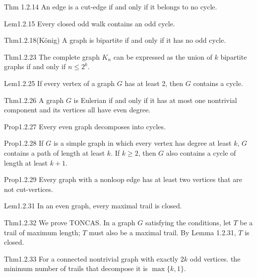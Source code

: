 \documentclass[dvipdfmx, leqno]{jsreport}
\begin{document}
\begin{soupractice}{Thm 1.2.14}
    An edge is a cut-edge if and only if it belongs to no cycle.
\end{soupractice}

\begin{soupractice}{Lem1.2.15}
    Every closed odd walk contains an odd cycle.
\end{soupractice}

\begin{soupractice}{Thm1.2.18(K\"onig)}
    A graph is bipartite if and only if it has no odd cycle.
\end{soupractice}

\begin{soupractice}{Thm1.2.23}
    The complete graph $K_n$ can be expressed as the union of $k$ bipartite graphs if and only if $n\le 2^k$.
\end{soupractice}

\begin{soupractice}{Lem1.2.25}
    If every vertex of a graph $G$ has at least 2, then $G$ contains a cycle.
\end{soupractice}

\begin{soupractice}{Thm1.2.26}
    A graph $G$ is  Eulerian if and only if it has at most one nontrivial component and its vertices all have even degree.
\end{soupractice}

\begin{soupractice}{Prop1.2.27}
    Every even graph decomposes into cycles.
\end{soupractice}

\begin{soupractice}{Prop1.2.28}
    If $G$ is a simple graph in which every vertex has degree at least $k$, $G$ contains a path of length at least $k$. If $k\ge 2$, then $G$ also contains a cycle of length at least $k+ 1$.
\end{soupractice}

\begin{soupractice}{Prop1.2.29}
    Every graph with a nonloop edge has at least two vertices that are not cut-vertices.
\end{soupractice}

\begin{soupractice}{Lem1.2.31}
    In an even graph, every maximal trail is closed.
\end{soupractice}

\begin{soupractice}{Thm1.2.32}
    We prove TONCAS. In a graph $G$ satisfying the conditions, let $T$ be a trail of maximum length; $T$ must also be a maximal trail. By Lemma 1.2.31, $T$ is closed.
\end{soupractice}

\begin{soupractice}{Thm1.2.33}
    For a connected nontrivial graph with exactly $2k$ odd vertices. the minimum number of trails that decompose it is $\max\{k, 1\}$.
\end{soupractice}
\end{document}
